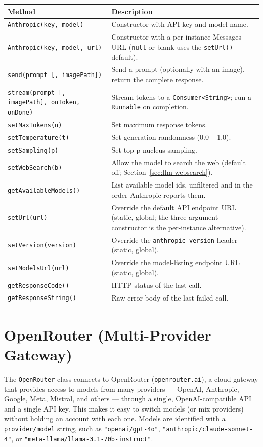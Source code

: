 \begin{longtable}{P{4.8cm}P{5.7cm}}
\toprule
\textbf{Method} & \textbf{Description} \\
\midrule
\endhead
\texttt{Anthropic(key, model)} & Constructor with API key and model name. \\
\texttt{Anthropic(key, model, url)} & Constructor with a per-instance Messages URL (\texttt{null} or blank uses the \texttt{setUrl()} default). \\
\texttt{send(prompt [, imagePath])} & Send a prompt (optionally with an image), return the complete response. \\
\texttt{stream(prompt [, imagePath], onToken, onDone)} & Stream tokens to a \texttt{Consumer<String>}; run a \texttt{Runnable} on completion. \\
\texttt{setMaxTokens(n)} & Set maximum response tokens. \\
\texttt{setTemperature(t)} & Set generation randomness (0.0 -- 1.0). \\
\texttt{setSampling(p)} & Set top-p nucleus sampling. \\
\texttt{setWebSearch(b)} & Allow the model to search the web (default off; Section~\ref{sec:llm-websearch}). \\
\texttt{getAvailableModels()} & List available model ids, unfiltered and in the order Anthropic reports them. \\
\texttt{setUrl(url)} & Override the default API endpoint URL (static, global; the three-argument constructor is the per-instance alternative). \\
\texttt{setVersion(version)} & Override the \texttt{anthropic-version} header (static, global). \\
\texttt{setModelsUrl(url)} & Override the model-listing endpoint URL (static, global). \\
\texttt{getResponseCode()} & HTTP status of the last call. \\
\texttt{getResponseString()} & Raw error body of the last failed call. \\
\bottomrule
\end{longtable}

\section{OpenRouter (Multi-Provider Gateway)}
\label{sec:llm-openrouter}

The \texttt{OpenRouter} class connects to OpenRouter (\texttt{openrouter.ai}), a cloud gateway that provides access to models from many providers --- OpenAI, Anthropic, Google, Meta, Mistral, and others --- through a single, OpenAI-compatible API and a single API key.  This makes it easy to switch models (or mix providers) without holding an account with each one.  Models are identified with a \texttt{provider/model} string, such as \texttt{"openai/gpt-4o"}, \texttt{"anthropic/claude-sonnet-4"}, or \texttt{"meta-llama/llama-3.1-70b-instruct"}.

